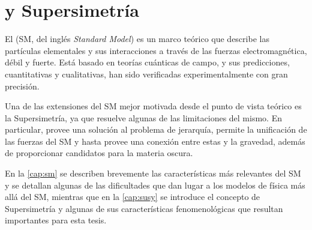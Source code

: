 \chapter{{\SM} y Supersimetría}
\label{cap:teoria}


El {\SM} (SM, del inglés \emph{Standard Model}) es un marco teórico que describe
las partículas elementales y sus interacciones a través de las fuerzas
electromagnética, débil y fuerte. Está basado en teorías cuánticas de campo, y
sus predicciones, cuantitativas y cualitativas, han sido verificadas
experimentalmente con gran precisión.

Una de las extensiones del SM mejor motivada desde el punto de vista teórico es
la Supersimetría, ya que resuelve algunas de las limitaciones del
mismo. En particular, provee una solución al problema de jerarquía, permite la
unificación de las fuerzas del SM y hasta provee una conexión entre estas y la
gravedad, además de proporcionar candidatos para la materia oscura.

En la \cref{cap:sm} se describen brevemente las características más relevantes
del SM y se detallan algunas de las dificultades que dan lugar a los modelos de
física más allá del SM, mientras que en la \cref{cap:susy} se introduce el
concepto de Supersimetría y algunas de sus características fenomenológicas que
resultan importantes para esta tesis.




